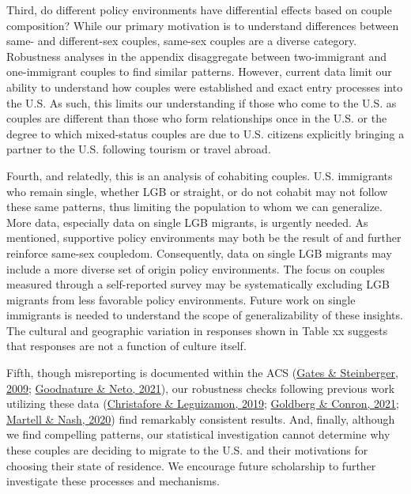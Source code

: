 \documentclass[
  11pt,
]{article}
\begin{document}
Third, do different policy environments have differential effects based on couple composition? While our primary motivation is to understand differences between same- and different-sex couples, same-sex couples are a diverse category. Robustness analyses in the appendix disaggregate between two-immigrant and one-immigrant couples to find similar patterns. However, current data limit our ability to understand how couples were established and exact entry processes into the U.S. As such, this limits our understanding if those who come to the U.S. as couples are different than those who form relationships once in the U.S. or the degree to which mixed-status couples are due to U.S. citizens explicitly bringing a partner to the U.S. following tourism or travel abroad.

Fourth, and relatedly, this is an analysis of cohabiting couples. U.S. immigrants who remain single, whether LGB or straight, or do not cohabit may not follow these same patterns, thus limiting the population to whom we can generalize. More data, especially data on single LGB migrants, is urgently needed. As mentioned, supportive policy environments may both be the result of and further reinforce same-sex coupledom. Consequently, data on single LGB migrants may include a more diverse set of origin policy environments. The focus on couples measured through a self-reported survey may be systematically excluding LGB migrants from less favorable policy environments. Future work on single immigrants is needed to understand the scope of generalizability of these insights. The cultural and geographic variation in responses shown in Table xx suggests that responses are not a function of culture itself.

Fifth, though misreporting is documented within the ACS (\protect\hyperlink{ref-gates_2009}{Gates \& Steinberger, 2009}; \protect\hyperlink{ref-goodnature_2021}{Goodnature \& Neto, 2021}), our robustness checks following previous work utilizing these data (\protect\hyperlink{ref-christafore_2019}{Christafore \& Leguizamon, 2019}; \protect\hyperlink{ref-goldberg_2021}{Goldberg \& Conron, 2021}; \protect\hyperlink{ref-martell_2020}{Martell \& Nash, 2020}) find remarkably consistent results. And, finally, although we find compelling patterns, our statistical investigation cannot determine why these couples are deciding to migrate to the U.S. and their motivations for choosing their state of residence. We encourage future scholarship to further investigate these processes and mechanisms.
\end{document}
